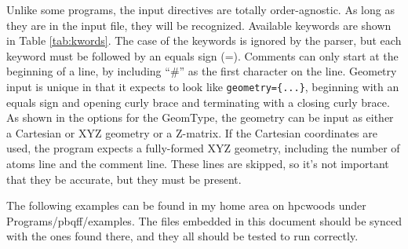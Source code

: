 \documentclass{article}
\begin{document}
Unlike some programs, the input directives are totally
order-agnostic. As long as they are in the input file, they will be
recognized. Available keywords are shown in Table \ref{tab:kwords}.
The case of the keywords is ignored by the parser, but each keyword
must be followed by an equals sign (=). Comments can only start at the
beginning of a line, by including ``\#'' as the first character on the
line. Geometry input is unique in that it expects to look like
\verb!geometry={...}!, beginning with an equals sign and opening curly
brace and terminating with a closing curly brace. As shown in the
options for the GeomType, the geometry can be input as either a
Cartesian or XYZ geometry or a Z-matrix. If the Cartesian coordinates
are used, the program expects a fully-formed XYZ geometry, including
the number of atoms line and the comment line. These lines are
skipped, so it's not important that they be accurate, but they must be
present.

The following examples can be found in my home area on hpcwoods under
Programs/pbqff/examples. The files embedded in this document should be
synced with the ones found there, and they all should be tested to run
correctly. 
\end{document}
